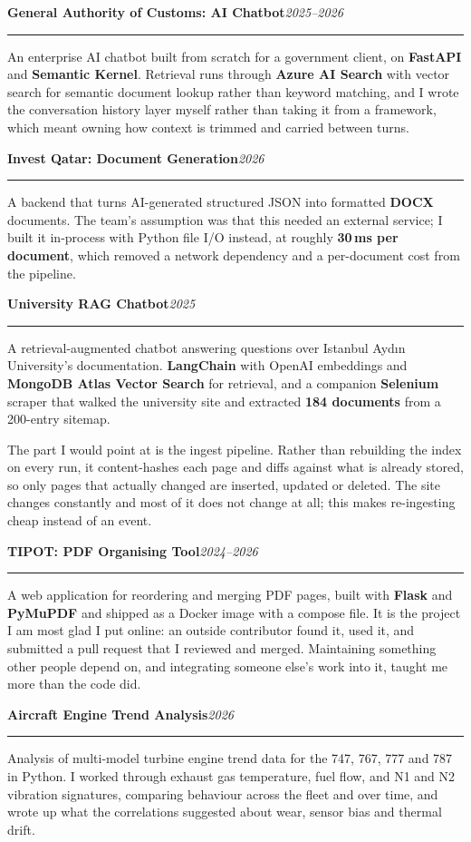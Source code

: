 \documentclass[11pt,a4paper]{article}
\newcommand{\entry}[2]{%
  \vspace{6pt}%
  {\Large\bfseries #1}\hfill{\itshape\small #2}\par
  \vspace{3pt}\hrule\vspace{4pt}%
}
\begin{document}
\entry{General Authority of Customs: AI Chatbot}{2025--2026}

An enterprise AI chatbot built from scratch for a government client, on
\textbf{FastAPI} and \textbf{Semantic Kernel}. Retrieval runs through
\textbf{Azure AI Search} with vector search for semantic document lookup rather
than keyword matching, and I wrote the conversation history layer myself rather
than taking it from a framework, which meant owning how context is trimmed and
carried between turns.

\entry{Invest Qatar: Document Generation}{2026}

A backend that turns AI-generated structured JSON into formatted \textbf{DOCX}
documents. The team's assumption was that this needed an external service; I
built it in-process with Python file I/O instead, at roughly \textbf{30\,ms per
document}, which removed a network dependency and a per-document cost from the
pipeline.

\entry{University RAG Chatbot}{2025}

A retrieval-augmented chatbot answering questions over Istanbul Ayd{\i}n
University's documentation. \textbf{LangChain} with OpenAI embeddings and
\textbf{MongoDB Atlas Vector Search} for retrieval, and a companion
\textbf{Selenium} scraper that walked the university site and extracted
\textbf{184 documents} from a 200-entry sitemap.

The part I would point at is the ingest pipeline. Rather than rebuilding the
index on every run, it content-hashes each page and diffs against what is
already stored, so only pages that actually changed are inserted, updated or
deleted. The site changes constantly and most of it does not change at all; this
makes re-ingesting cheap instead of an event.

\entry{TIPOT: PDF Organising Tool}{2024--2026}

A web application for reordering and merging PDF pages, built with
\textbf{Flask} and \textbf{PyMuPDF} and shipped as a Docker image with a
compose file. It is the project I am most glad I put online: an outside
contributor found it, used it, and submitted a pull request that I reviewed and
merged. Maintaining something other people depend on, and integrating someone
else's work into it, taught me more than the code did.

\entry{Aircraft Engine Trend Analysis}{2026}

Analysis of multi-model turbine engine trend data for the 747, 767, 777 and 787
in Python. I worked through exhaust gas temperature, fuel flow, and N1 and N2
vibration signatures, comparing behaviour across the fleet and over time, and
wrote up what the correlations suggested about wear, sensor bias and thermal
drift.
\end{document}
